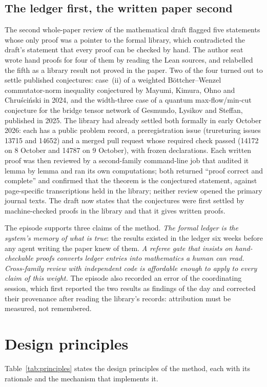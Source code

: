 \documentclass[11pt]{article}
\begin{document}
\subsection{The ledger first, the written paper second}
\label{sec:ledgerfirst}
The second whole-paper review of the mathematical draft flagged five
statements whose only proof was a pointer to the formal library, which
contradicted the draft's statement that every proof can be checked by hand.
The author seat wrote hand proofs for four of them by reading the Lean
sources, and relabelled the fifth as a library result not proved in the
paper. Two of the four turned out to settle published conjectures: case~(ii)
of a weighted Böttcher--Wenzel commutator-norm inequality conjectured by
Mayumi, Kimura, Ohno and Chruściński in 2024, and the width-three case of a
quantum max-flow/min-cut conjecture for the bridge tensor network of
Gesmundo, Lysikov and Steffan, published in 2025. The library had already
settled both formally in early October 2026: each has a public problem
record, a preregistration issue (trureturing issues 13715 and 14652) and a
merged pull request whose required check passed (14172 on 8 October and
14787 on 9 October), with frozen declarations. Each written proof was then
reviewed by a second-family command-line job that audited it lemma by lemma
and ran its own computations; both returned ``proof correct and complete''
and confirmed that the theorem is the conjectured statement, against
page-specific transcriptions held in the library; neither review opened the
primary journal texts. The draft now states that the conjectures were first
settled by machine-checked proofs in the library and that it gives written
proofs.

The episode supports three claims of the method. \emph{The formal ledger is
the system's memory of what is true}: the results existed in the ledger six
weeks before any agent writing the paper knew of them. \emph{A referee gate
that insists on hand-checkable proofs converts ledger entries into
mathematics a human can read.} \emph{Cross-family review with independent
code is affordable enough to apply to every claim of this weight.} The
episode also recorded an error of the coordinating session, which first
reported the two results as findings of the day and corrected their
provenance after reading the library's records: attribution must be measured,
not remembered.

\section{Design principles}
\label{sec:lessons}
Table~\ref{tab:principles} states the design principles of the method, each
with its rationale and the mechanism that implements it.
\end{document}
